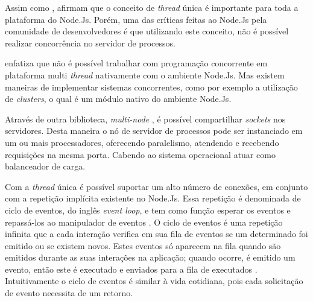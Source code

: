   Assim como ,  afirmam que o conceito de \textit{thread} única é importante para 
  toda a plataforma do Node.Js. Porém, uma das críticas feitas ao Node.Js pela comunidade de desenvolvedores 
  é que utilizando este conceito, não é possível realizar concorrência no servidor de processos.
  
   enfatiza que não é possível trabalhar com programação 
  concorrente em plataforma multi \textit{thread} nativamente com o ambiente Node.Js. Mas existem maneiras de implementar sistemas concorrentes, 
  como por exemplo a utilização de \textit{clusters}, o qual é um módulo nativo do ambiente Node.Js.
  
  Através de outra biblioteca, \textit{multi-node} , é possível compartilhar \textit{sockets} nos servidores.
  Desta maneira o nó de servidor de processos pode ser instanciado em um ou mais processadores, oferecendo paralelismo, 
  atendendo e recebendo requisições na mesma porta. Cabendo ao sistema operacional atuar como balanceador de carga.\cite{Oliveira:2012}
  
  Com a \textit{thread} única é possível suportar um alto número de conexões, em conjunto com a repetição implícita existente no Node.Js. 
  Essa repetição é denominada de ciclo de eventos, do inglês \textit{event loop}, e tem como função esperar os eventos e repassá-los 
  ao manipulador de eventos \cite{Tilkov:2010}.
  O ciclo de eventos é uma repetição infinita que a cada interação verifica em sua 
  fila de eventos se um determinado foi emitido ou se existem novos. Estes eventos só aparecem na 
  fila quando são emitidos durante as suas interações na aplicação; quando ocorre, é emitido um evento, então este
  é executado e enviados para a fila de executados \cite{Pereira:2013}.
  Intuitivamente o ciclo de eventos é similar à vida cotidiana, pois cada solicitação de evento necessita de um retorno.
  
  
